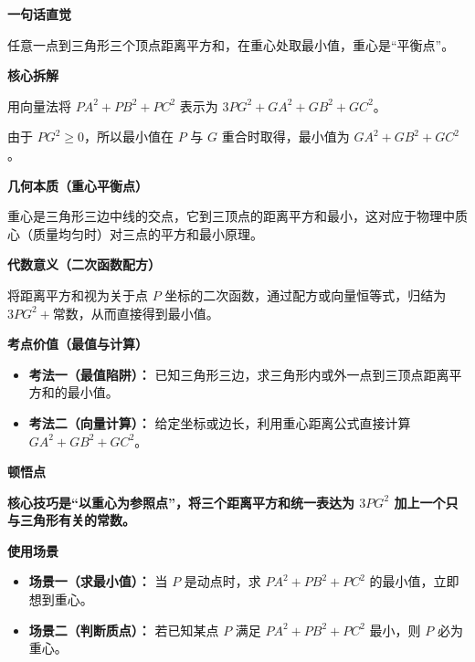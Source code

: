 \begin{explanationbox}
	\textbf{\textcolor{CExplanation}{一句话直觉}}

	任意一点到三角形三个顶点距离平方和，在重心处取最小值，重心是“平衡点”。

	\medskip
	\textbf{\textcolor{CExplanation}{核心拆解}}
	\begin{description}[style=nextline, leftmargin=2.8em, labelsep=0.5em, itemsep=0.45em]
		\item[\textbf{要点一（向量拆分）：}] 用向量法将 $PA^2+PB^2+PC^2$ 表示为 $3PG^2 + GA^2+GB^2+GC^2$。
		\item[\textbf{要点二（最小值判定）：}] 由于 $PG^2 \ge 0$，所以最小值在 $P$ 与 $G$ 重合时取得，最小值为 $GA^2+GB^2+GC^2$。
	\end{description}

	\medskip
	\textbf{\textcolor{CExplanation}{几何本质（重心平衡点）}}

	重心是三角形三边中线的交点，它到三顶点的距离平方和最小，这对应于物理中质心（质量均匀时）对三点的平方和最小原理。

	\medskip
	\textbf{\textcolor{CExplanation}{代数意义（二次函数配方）}}

	将距离平方和视为关于点 $P$ 坐标的二次函数，通过配方或向量恒等式，归结为 $3PG^2 + \text{常数}$，从而直接得到最小值。

	\medskip
	\textbf{\textcolor{CExplanation}{考点价值（最值与计算）}}
	\begin{itemize}[leftmargin=*, itemsep=0.5em, topsep=0.4em]
		\item \textbf{考法一（最值陷阱）：} 已知三角形三边，求三角形内或外一点到三顶点距离平方和的最小值。
		\item \textbf{考法二（向量计算）：} 给定坐标或边长，利用重心距离公式直接计算 $GA^2+GB^2+GC^2$。
	\end{itemize}

	\medskip
	\textbf{\textcolor{CExplanation}{顿悟点}}

	\textbf{核心技巧是“以重心为参照点”，将三个距离平方和统一表达为 $3PG^2$ 加上一个只与三角形有关的常数。}

	\medskip
	\textbf{\textcolor{CExplanation}{使用场景}}
	\begin{itemize}[leftmargin=*, itemsep=0.5em, topsep=0.4em]
		\item \textbf{场景一（求最小值）：} 当 $P$ 是动点时，求 $PA^2+PB^2+PC^2$ 的最小值，立即想到重心。
		\item \textbf{场景二（判断质点）：} 若已知某点 $P$ 满足 $PA^2+PB^2+PC^2$ 最小，则 $P$ 必为重心。
	\end{itemize}
\end{explanationbox}
